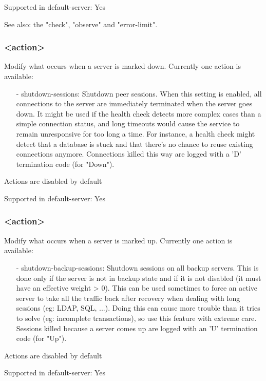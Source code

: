   Supported in default-server: Yes

  See also: the "check", "observe" and "error-limit".

\subsubsection[on-marked-down]{ <action>}
  Modify what occurs when a server is marked down.
  Currently one action is available:
  \begin{itemize}
  \item[-] shutdown-sessions: Shutdown peer sessions. When this setting is enabled,
    all connections to the server are immediately terminated when the server
    goes down. It might be used if the health check detects more complex cases
    than a simple connection status, and long timeouts would cause the service
    to remain unresponsive for too long a time. For instance, a health check
    might detect that a database is stuck and that there's no chance to reuse
    existing connections anymore. Connections killed this way are logged with
    a 'D' termination code (for "Down").
  \end{itemize}

  Actions are disabled by default

  Supported in default-server: Yes

\subsubsection[on-marked-up]{ <action>}
  Modify what occurs when a server is marked up.
  Currently one action is available:
  \begin{itemize}
  \item[-] shutdown-backup-sessions: Shutdown sessions on all backup servers. This is
    done only if the server is not in backup state and if it is not disabled
    (it must have an effective weight > 0). This can be used sometimes to force
    an active server to take all the traffic back after recovery when dealing
    with long sessions (eg: LDAP, SQL, ...). Doing this can cause more trouble
    than it tries to solve (eg: incomplete transactions), so use this feature
    with extreme care. Sessions killed because a server comes up are logged
    with an 'U' termination code (for "Up").
  \end{itemize}

  Actions are disabled by default

  Supported in default-server: Yes

